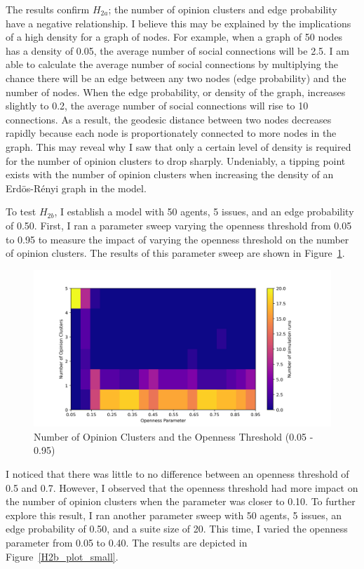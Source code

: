 The results confirm $H_{2a}$; the number of opinion clusters and edge probability have a negative relationship. I believe this may be explained by the implications of a high density for a graph of nodes. For example, when a graph of 50 nodes has a density of 0.05, the average number of social connections will be 2.5. I am able to calculate the average number of social connections by multiplying the chance there will be an edge between any two nodes (edge probability) and the number of nodes. When the edge probability, or density of the graph, increases slightly to 0.2, the average number of social connections will rise to 10 connections. As a result, the geodesic distance between two nodes decreases rapidly because each node is proportionately connected to more nodes in the graph. This may reveal why I saw that only a certain level of density is required for the number of opinion clusters to drop sharply. Undeniably, a tipping point exists with the number of opinion clusters when increasing the density of an Erd\"{o}s-R\'{e}nyi graph in the model.  

To test $H_{2b}$, I establish a model with 50 agents, 5 issues, and an edge
probability of 0.50. First, I ran a parameter sweep varying the openness
threshold from 0.05 to 0.95 to measure the impact of varying the openness
threshold on the number of opinion clusters. The results of this parameter
sweep are shown in Figure~\ref{H2b_plot_big}.

\begin{figure}
\centering
\includegraphics[width=1.0\columnwidth]{./Graphs/Cluster_openBig.png}
\caption{Number of Opinion Clusters and the Openness Threshold (0.05 - 0.95)}
\label{H2b_plot_big}
\end{figure}

I noticed that there was little to no difference between an openness threshold
of 0.5 and 0.7. However, I observed that the openness threshold had more
impact on the number of opinion clusters when the parameter was closer to 0.10.
To further explore this result, I ran another parameter sweep with 50 agents,
5 issues, an edge probability of 0.50, and a suite size of 20. This time, I
varied the openness parameter from 0.05 to 0.40. The results are depicted in
Figure~\ref{H2b_plot_small}.


